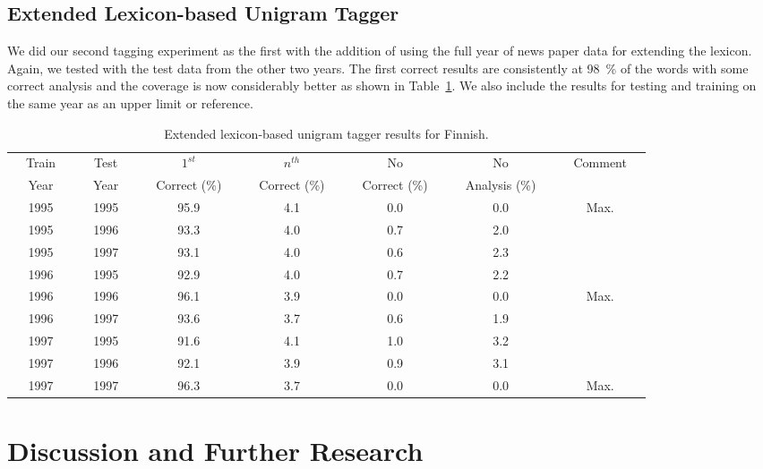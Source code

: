 \documentclass[a4paper]{article}
\begin{document}
\subsection{Extended Lexicon-based Unigram Tagger}

We did our second tagging experiment as the first with the addition of
using the full year of news paper data for extending the lexicon.
Again, we tested with the test data from the other two years. The
first correct results are consistently at 98~\% of the words with some
correct analysis and the coverage is now considerably better as shown
in Table~\ref{tab:taggerresults2}. We also include the results for
testing and training on the same year as an upper limit or reference.

\begin{table}[h!]
  \centering
  \caption{Extended lexicon-based unigram tagger results for Finnish.
  }\label{tab:taggerresults2}
  \begin{scriptsize}
    \begin{tabular}{c|c|c|c|c|c|c}
      \hline
      ~~Train~~ & ~~Test~~ & ~~$1^{st}$~~& ~~$n^{th}$~~ & ~~No~~ & ~~No~~ & ~~Comment~~\\
      ~~Year~~ & ~~Year~~ & ~~Correct (\%)~~ & ~~Correct (\%)~~ & ~~Correct (\%)~~ & ~~Analysis (\%)~~ \\
      \hline 
      1995 & 1995 & 95.9 & 4.1 & 0.0 & 0.0 & ~~Max.~~\\
      1995 & 1996 & 93.3 & 4.0 & 0.7 & 2.0 & \\
      1995 & 1997 & 93.1 & 4.0 & 0.6 & 2.3 & \\
      \hline 
      1996 & 1995 & 92.9 & 4.0 & 0.7 & 2.2 & \\
      1996 & 1996 & 96.1 & 3.9 & 0.0 & 0.0 & ~~Max.~~\\
      1996 & 1997 & 93.6 & 3.7 & 0.6 & 1.9 & \\
      \hline 
      1997 & 1995 & 91.6 & 4.1 & 1.0 & 3.2 & \\
      1997 & 1996 & 92.1 & 3.9 & 0.9 & 3.1 & \\
      1997 & 1997 & 96.3 & 3.7 & 0.0 & 0.0 & ~~Max.~~\\
      \hline 
    \end{tabular}
  \end{scriptsize}
\end{table}

\section{Discussion and Further Research}
\label{Sect7}
\end{document}

